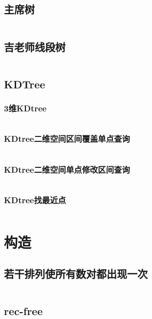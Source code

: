 \documentclass{article}
\begin{document}
\subsection{主席树}
\inputminted[breaklines]{c++}{../数据结构/主席树.cpp}

\subsection{吉老师线段树}
\inputminted[breaklines]{c++}{../数据结构/吉老师线段树.cpp}

\subsection{KDTree}
\subsubsection{3维KDtree}
\inputminted[breaklines]{c++}{../数据结构/3维KDtree.cpp}

\subsubsection{KDtree二维空间区间覆盖单点查询}
\inputminted[breaklines]{c++}{../数据结构/KDtree二维空间区间覆盖单点查询.cpp}

\subsubsection{KDtree二维空间单点修改区间查询}
\inputminted[breaklines]{c++}{../数据结构/KDtree二维空间单点修改区间查询.cpp}

\subsubsection{KDtree找最近点}
\inputminted[breaklines]{c++}{../数据结构/KDtree找最近点.cpp}

\newpage
\section{构造}
\subsection{若干排列使所有数对都出现一次}
\inputminted[breaklines]{c++}{../构造/若干排列使所有数对都出现一次.cpp}

\subsection{rec-free}
\inputminted[breaklines]{c++}{../构造/rec-free.cpp}
\end{document}
